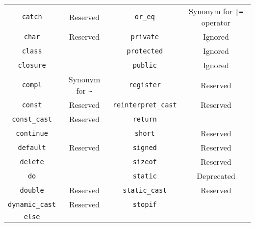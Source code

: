 \begin{table}[\floatpos]
\begin{tabular}{|c|c||c|c|}
    \lstinline"catch"             & Reserved                                &
    \lstinline"or_eq"             & Synonym for \lstinline-|=- operator     \\
    \lstinline"char"              & Reserved                                &
    \lstinline"private"           & Ignored                                 \\
    \lstinline"class"             &                                         &
    \lstinline"protected"         & Ignored                                 \\
    \lstinline"closure"           &                                         &
    \lstinline"public"            & Ignored                                 \\
    \lstinline"compl"             & Synonym for \lstinline|~|               &
    \lstinline"register"          & Reserved                                \\
    \lstinline"const"             & Reserved                                &
    \lstinline"reinterpret_cast"  & Reserved                               \\
    \lstinline"const_cast"        & Reserved                                &
    \lstinline"return"            &                                         \\
    \lstinline"continue"          &                                         &
    \lstinline"short"             & Reserved                                \\
    \lstinline"default"           & Reserved                                &
    \lstinline"signed"            & Reserved                                \\
    \lstinline"delete"            &                                         &
    \lstinline"sizeof"            & Reserved                                \\
    \lstinline"do"                &                                         &
    \lstinline"static"            & Deprecated                              \\
    \lstinline"double"            & Reserved                                &
    \lstinline"static_cast"       & Reserved                                \\
    \lstinline"dynamic_cast"      & Reserved                                &
    \lstinline"stopif"            &                                         \\
    \lstinline"else"              &                                         &

\end{tabular}
\end{table}
